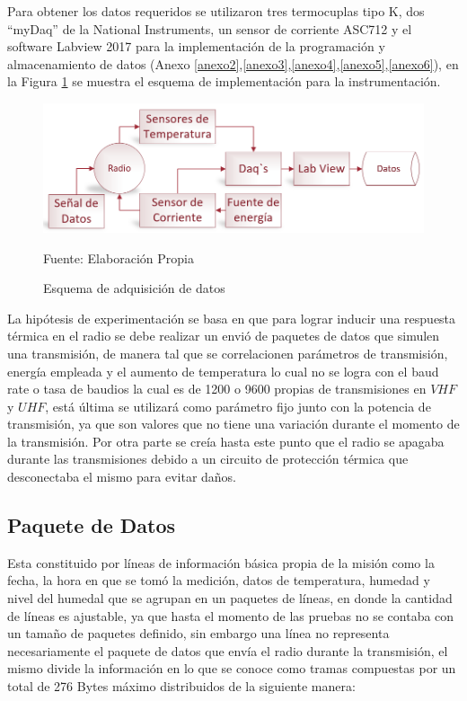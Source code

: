 Para obtener los datos requeridos se utilizaron tres termocuplas tipo K, dos ``myDaq'' de la National Instruments, un sensor de corriente ASC712 y el software Labview 2017 para la implementación de la programación y almacenamiento de datos (Anexo \ref{anexo2},\ref{anexo3},\ref{anexo4},\ref{anexo5},\ref{anexo6}), en la Figura \ref{esquemaadquisicion} se muestra el esquema de implementación para la instrumentación. 

\begin{figure}[H]
\centering
\includegraphics[scale=0.6]{Figuras/adquisicion.png}
\caption{Esquema de adquisición de datos}
Fuente: Elaboración Propia
\label{esquemaadquisicion}
\end{figure}

La hipótesis de experimentación se basa en que para lograr inducir una respuesta térmica en el radio se debe realizar un envió de paquetes de datos que simulen una transmisión, de manera tal que se correlacionen parámetros de transmisión, energía empleada y el aumento de temperatura lo cual no se logra con el baud rate o tasa de baudios la cual es de 1200 o 9600 propias de transmisiones en $VHF$ y $UHF$, está última se utilizará como parámetro fijo junto con la potencia de transmisión, ya que son valores que no tiene una variación durante el momento de la transmisión. Por otra parte se creía hasta este punto que el radio se apagaba durante las transmisiones debido a un circuito de protección térmica que desconectaba el mismo para evitar daños.

\subsection{Paquete de Datos}Esta constituido por líneas de información básica propia de la misión como la fecha, la hora en que se tomó la medición, datos de temperatura, humedad y nivel del humedal que se agrupan en un paquetes de líneas, en donde la cantidad de líneas es ajustable, ya que hasta el momento de las pruebas no se contaba con un tamaño de paquetes definido, sin embargo una línea no representa necesariamente el paquete de datos que envía el radio durante la transmisión, el mismo divide la información en lo que se conoce como tramas compuestas por un total de 276 Bytes máximo distribuidos de la siguiente manera:

